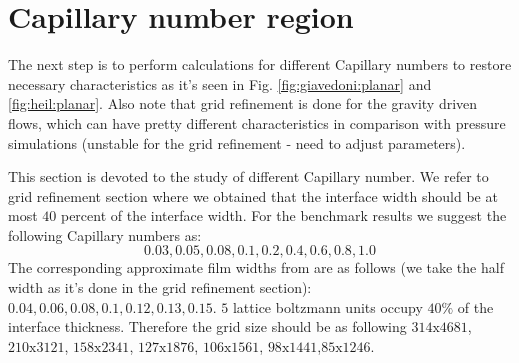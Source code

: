 \documentclass{article}
\begin{document}
\section{Capillary number region}


{\color{red} The next step is to perform calculations for different Capillary
numbers to restore necessary characteristics as it's seen in Fig.
\ref{fig:giavedoni:planar} and \ref{fig:heil:planar}. Also note that grid
refinement is done for the gravity driven flows, which can have pretty
different characteristics in comparison with pressure simulations (unstable
for the grid refinement - need to adjust parameters)}.


This section is devoted to the study of different Capillary number. We refer to
grid refinement section where we obtained that the interface width should be
at most $40$ percent of the interface width. For the benchmark results we
suggest the following Capillary numbers as:
\begin{equation}
0.03,0.05,0.08,0.1,0.2,0.4,0.6,0.8,1.0
\end{equation}
The corresponding approximate film widths from \cite{giavedoni-numerical} are as
follows (we take the half width as it's done in the grid refinement section):
$0.04,0.06,0.08,0.1,0.12,0.13,0.15$. $5$ lattice boltzmann units occupy
$40\%$ of the interface thickness. Therefore the grid size should be as
following $314\mathrm{x}4681$,$210\mathrm{x}3121$,
$158\mathrm{x}2341$, $127\mathrm{x}1876$, $106\mathrm{x}1561$,
$98\mathrm{x}1441$,$85\mathrm{x}1246$. 
\end{document}
